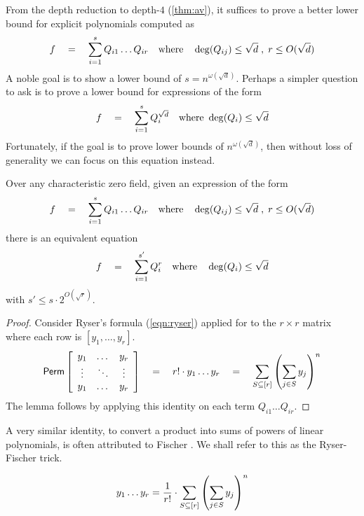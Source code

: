 From the depth reduction to depth-$4$ (\autoref{thm:av}), it suffices to
prove a better lower bound for explicit polynomials computed as
\begin{equation}\label{eqn:d4-LB}
f\quad = \quad \sum_{i=1}^s Q_{i1}\dots Q_{ir} \quad\text{where}\quad \deg(Q_{ij})\leq \sqrt{d}\;,\; r\leq O(\sqrt{d})
\end{equation}
A noble goal is to show a lower bound of $s = n^{\omega(\sqrt{d})}$.
Perhaps a simpler question to ask is to prove a lower bound for
expressions of the form
\begin{equation}\label{eqn:d4pow-LB}
f\quad = \quad \sum_{i=1}^s Q_{i}^{\sqrt{d}} \quad\text{where }\deg(Q_i)\leq \sqrt{d}
\end{equation}
Fortunately, if the goal is to prove lower bounds of
$n^{\omega(\sqrt{d})}$, then without loss of generality we can focus
on this equation instead.

\begin{lemma}\label{lem:fischer}
  Over any characteristic zero field, given an expression of the form
  \[
  f\quad = \quad \sum_{i=1}^s Q_{i1}\dots Q_{ir} \quad\text{where}\quad \deg(Q_{ij})\leq \sqrt{d}\;,\; r\leq O(\sqrt{d})
  \]
  there is an equivalent equation
  \[
  f\quad = \quad \sum_{i=1}^{s'} Q_{i}^r\quad\text{where}\quad \deg(Q_{i})\leq \sqrt{d}
  \]
  with $s' \leq s \cdot 2^{O(\sqrt{r})}$. 
\end{lemma}
\begin{proof}
  Consider Ryser's formula (\ref{eqn:ryser}) applied for to the
  $r\times r$ matrix where each row is $[y_1,\dots, y_r]$. 
  \[
  \mathsf{Perm} \left[\begin{array}{ccc} y_1 & \dots & y_r\\ \vdots & \ddots & \vdots \\ y_1 & \dots & y_r\end{array}\right] \quad = \quad r! \cdot y_1\dots y_r \quad = \quad \sum_{S\subseteq [r]} \left(\sum_{j\in S} y_j\right)^n
  \]
  The lemma follows by applying this identity on each term
  $Q_{i1}\dots Q_{ir}$. 
\end{proof}

A very similar identity, to convert a product into sums of powers of
linear polynomials, is often attributed to Fischer \cite{fischer}.
We shall refer to this as the Ryser-Fischer trick. 

\begin{lemma}\label{lem:ryser-fischer}
$$y_1 \dots y_r  = \frac{1}{r!} \cdot \sum_{S\subseteq [r]} \left(\sum_{j\in S} y_j\right)^n$$
\end{lemma}

